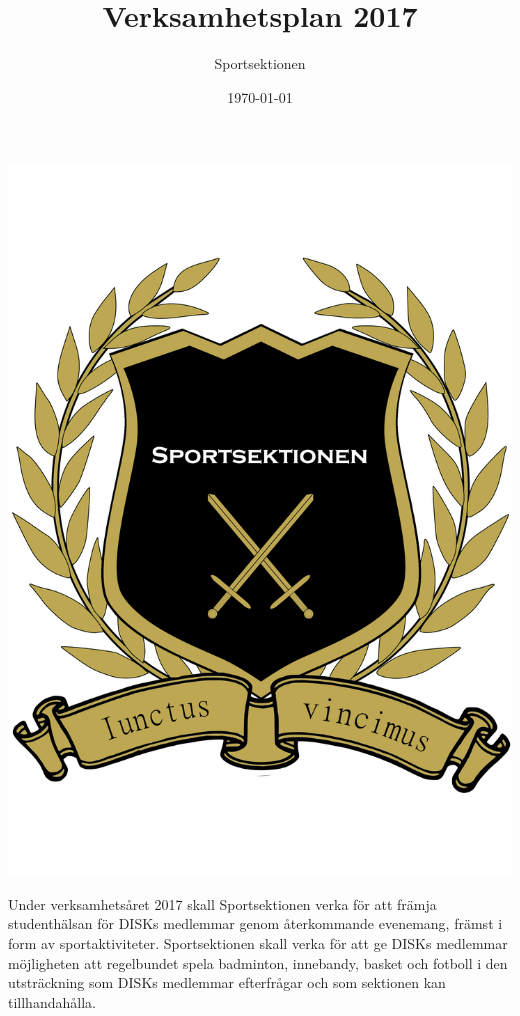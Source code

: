 \documentclass[12pt,a4paper]{article}
\begin{document}
	\title{\Huge Verksamhetsplan 2017}
	\author{Sportsektionen}
	\date{\today}

	\maketitle


	\begin{center}
		\includegraphics[scale=0.1]{../../Images/logo/logo}
	\end{center}


	\null
	\vfill

	\clearpage

	Under verksamhetsåret 2017 skall Sportsektionen verka för att främja studenthälsan för DISKs medlemmar genom återkommande evenemang, främst i form av sportaktiviteter.
	Sportsektionen skall verka för att ge DISKs medlemmar möjligheten att regelbundet spela badminton, innebandy, basket och fotboll i den utsträckning som DISKs medlemmar efterfrågar och som sektionen kan tillhandahålla.
\end{document}
